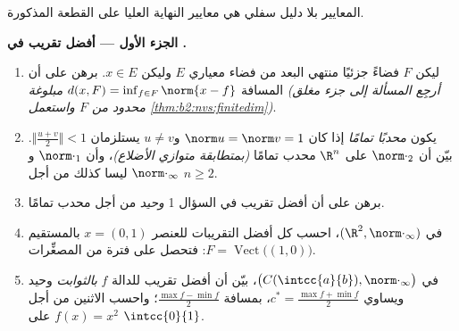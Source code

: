 \begin{problem}
\label{pb:b2:nvs:1}
المعايير بلا دليل سفلي هي معايير النهاية العليا على القطعة المذكورة.

\medskip
\noindent\textbf{الجزء الأول --- أفضل تقريب في .}
\begin{enumerate}
  \item ليكن $F$ فضاءً جزئيًا منتهي البعد من فضاء معياري
        $E$ وليكن $x \in E$. برهن على أن المسافة $d(x,
        F) = \inf_{f \in F}\norm{x - f}$ \emph{مبلوغة}
        \emph{(أرجِع المسألة إلى جزء مغلق محدود من $F$ واستعمل
        \cref{thm:b2:nvs:finitedim})}.
  \item يكون  \emph{محدبًا تمامًا} إذا كان $\norm u = \norm v
        = 1$ و$u \neq v$ يستلزمان $\bigl\Vert\frac{u +
        v}2\bigr\Vert < 1$. بيّن أن $\norm\cdot_2$ على $\R^n$
        محدب تمامًا \emph{(بمتطابقة متوازي الأضلاع)}، وأن
        $\norm\cdot_1$ و$\norm\cdot_\infty$ ليسا كذلك من أجل
        $n \geq 2$.
  \item برهن على أن أفضل تقريب في السؤال 1 \emph{وحيد} من أجل
         محدب تمامًا.
  \item في $(\R^2, \norm\cdot_\infty)$، احسب كل أفضل
        التقريبات للعنصر $x = (0, 1)$ بالمستقيم $F =
        \operatorname{Vect}\bigl((1,0)\bigr)$: فتحصل على فترة
        من المصغِّرات.
  \item في $\bigl(C(\intcc{a}{b}), \norm\cdot_\infty\bigr)$،
        بيّن أن أفضل تقريب للدالة $f$ \emph{بالثوابت}
        وحيد ويساوي $c^* = \frac{\max f
        + \min f}{2}$، بمسافة $\frac{\max f - \min
        f}{2}$؛ واحسب الاثنين من أجل $f(x) = x^2$ على
        $\intcc{0}{1}$.
\end{enumerate}


\end{problem}
